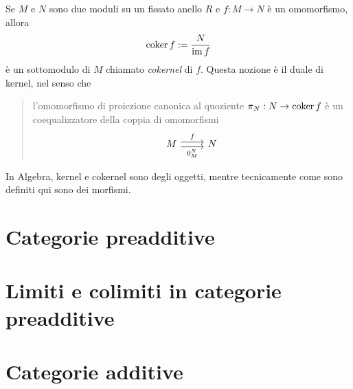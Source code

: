 \begin{example}
  Se \(M\) e \(N\) sono due moduli su un fissato anello \(R\) e
  \(f : M \to N\) è un omomorfismo, allora
  \[
    \operatorname{coker} f := \frac{N}{\operatorname{im} f}
  \]
  è un sottomodulo di \(M\) chiamato {\em cokernel} di \(f\). Questa
  nozione è il duale di kernel, nel senso che
  \begin{quotation}
    l'omomorfismo di proiezione canonica al quoziente
    \(\pi_N : N \to \operatorname{coker} f\) è un coequalizzatore della coppia di
    omomorfismi
    \[
      \begin{tikzcd}
        M \ar["f", shift left, r] \ar["{0_M^N}", shift right, swap, r]
        & N
      \end{tikzcd}
    \]
  \end{quotation}
\end{example}

\begin{remark}
  In Algebra, kernel e cokernel sono degli oggetti, mentre
  tecnicamente come sono definiti qui sono dei morfismi.
\end{remark}



\section{Categorie preadditive}


\section{Limiti e colimiti in categorie preadditive}


\section{Categorie additive}




